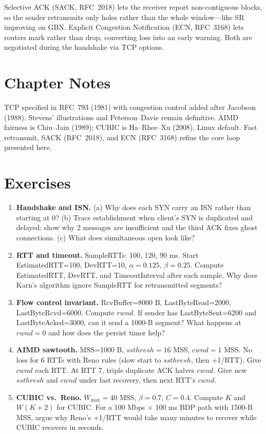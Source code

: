 \begin{remark} Selective ACK (SACK, RFC~2018) lets the receiver report non-contiguous blocks, so the sender retransmits only holes rather than the whole window---like SR improving on GBN. Explicit Congestion Notification (ECN, RFC~3168) lets routers mark rather than drop, converting loss into an early warning. Both are negotiated during the handshake via TCP options.
\end{remark}

\section{Chapter Notes}
TCP specified in RFC~793 (1981) with congestion control added after Jacobson (1988). Stevens' illustrations and Peterson--Davie remain definitive. AIMD fairness is Chiu--Jain (1989); CUBIC is Ha--Rhee--Xu (2008), Linux default. Fast retransmit, SACK (RFC~2018), and ECN (RFC~3168) refine the core loop presented here.

\section{Exercises}
\label{sec:ch04-exercises}
\begin{enumerate}[label=E4.\arabic*, leftmargin=*, itemsep=0.8em]
\item \textbf{Handshake and ISN.} (a) Why does each SYN carry an ISN rather than starting at 0? (b) Trace establishment when client's SYN is duplicated and delayed: show why 2 messages are insufficient and the third ACK fixes ghost connections. (c) What does simultaneous open look like?
\item \textbf{RTT and timeout.} SampleRTTs: 100, 120, 90 ms. Start EstimatedRTT=100, DevRTT=10, $\alpha=0.125$, $\beta=0.25$. Compute EstimatedRTT, DevRTT, and TimeoutInterval after each sample. Why does Karn's algorithm ignore SampleRTT for retransmitted segments?
\item \textbf{Flow control invariant.} RcvBuffer=8000 B, LastByteRead=2000, LastByteRcvd=6000. Compute $rwnd$. If sender has LastByteSent=6200 and LastByteAcked=3000, can it send a 1000-B segment? What happens at $rwnd=0$ and how does the persist timer help?
\item \textbf{AIMD sawtooth.} MSS=1000 B, $ssthresh=16$ MSS, $cwnd=1$ MSS. No loss for 6 RTTs with Reno rules (slow start to $ssthresh$, then +1/RTT). Give $cwnd$ each RTT. At RTT 7, triple duplicate ACK halves $cwnd$. Give new $ssthresh$ and $cwnd$ under fast recovery, then next RTT's $cwnd$.
\item \textbf{CUBIC vs.\ Reno.} $W_{\max}=40$ MSS, $\beta=0.7$, $C=0.4$. Compute $K$ and $W(K+2)$ for CUBIC. For a 100 Mbps $\times$ 100 ms BDP path with 1500-B MSS, argue why Reno's +1/RTT would take many minutes to recover while CUBIC recovers in seconds.
\end{enumerate}
